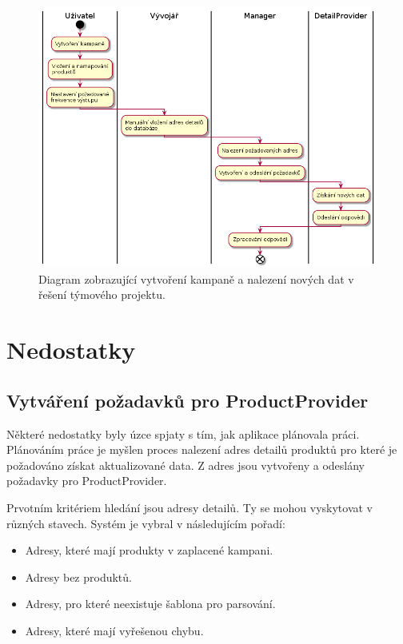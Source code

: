 \documentclass[thesis=B,czech]{FITthesis}[2012/06/26]
\begin{document}
\begin{figure}[h]\centering
 	\includegraphics[width=1.0\textwidth]{resources/legacy-process-activity}
	\caption[Diagram zobrazující vytvoření kampaně a nalezení nových dat v původním řešení týmového projektu]
	{Diagram zobrazující vytvoření kampaně a nalezení nových dat v řešení týmového projektu.}\label{fig:legacyprocess-activity}
\end{figure}

\section{Nedostatky}

\subsection{Vytváření požadavků pro ProductProvider}
Některé nedostatky byly úzce spjaty s tím, jak aplikace plánovala práci. Plánováním práce je myšlen proces
nalezení adres detailů produktů pro které je požadováno získat aktualizované data. Z adres jsou vytvořeny a odeslány požadavky pro ProductProvider.
\par
Prvotním kritériem hledání jsou adresy detailů. Ty se mohou vyskytovat v různých stavech. Systém je vybral v 
následujícím pořadí:

\begin{itemize}
\item Adresy, které mají produkty v zaplacené kampani.
\item Adresy bez produktů.
\item Adresy, pro které neexistuje šablona pro parsování.
\item Adresy, které mají vyřešenou chybu.
\end{itemize}
\end{document}
